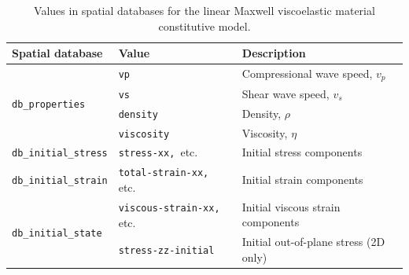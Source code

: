 \noindent \begin{center}
\begin{table}[H]
\noindent \centering{}\caption{\label{tab:linearMaxwell}Values in spatial databases for the linear
Maxwell viscoelastic material constitutive model.}
\begin{tabular}{|l|l|l|}
\hline 
\textbf{Spatial database} & \textbf{Value} & \textbf{Description}\tabularnewline
\hline 
\hline 
\multirow{4}{*}{\texttt{db\_properties}} & \texttt{vp} & Compressional wave speed, $v_{p}$\tabularnewline
\cline{2-3} 
 & \texttt{vs} & Shear wave speed, $v_{s}$\tabularnewline
\cline{2-3} 
 & \texttt{density} & Density, $\rho$\tabularnewline
\cline{2-3} 
 & \texttt{viscosity} & Viscosity, $\eta$\tabularnewline
\hline 
\texttt{db\_initial\_stress} & \texttt{stress-xx, }etc. & Initial stress components\tabularnewline
\hline 
\texttt{db\_initial\_strain} & \texttt{total-strain-xx, }etc. & Initial strain components\tabularnewline
\hline 
\multirow{2}{*}{\texttt{db\_initial\_state}} & \texttt{viscous-strain-xx, }etc. & Initial viscous strain components\tabularnewline
\cline{2-3} 
 & \texttt{stress-zz-initial} & Initial out-of-plane stress (2D only)\tabularnewline
\hline 
\end{tabular}
\end{table}

\par\end{center}

